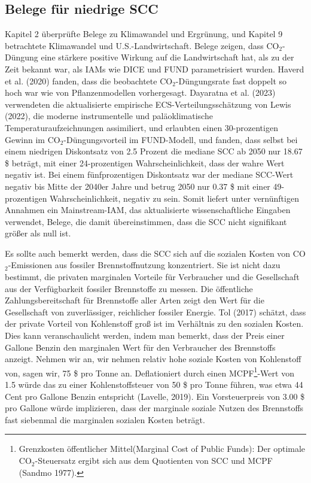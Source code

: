 \documentclass[12pt,paper=a4,DIV=12,parskip=never,chapterprefix=false,headings=standardclasses]{scrreprt}
\begin{document}
\subsection{Belege für niedrige SCC}
Kapitel 2 überprüfte Belege zu Klimawandel und Ergrünung, und Kapitel 9 betrachtete Klimawandel und U.S.-Landwirtschaft. Belege zeigen, dass CO$_2$-Düngung eine stärkere positive Wirkung auf die Landwirtschaft hat, als zu der Zeit bekannt war, als IAMs wie DICE und FUND parametrisiert wurden. Haverd et al. (2020) fanden, dass die beobachtete CO$_2$-Düngungsrate fast doppelt so hoch war wie von Pflanzenmodellen vorhergesagt.
Dayaratna et al. (2023) verwendeten die aktualisierte empirische ECS-Verteilungsschätzung von Lewis (2022), die moderne instrumentelle und paläoklimatische Temperaturaufzeichnungen assimiliert, und erlaubten einen 30-prozentigen Gewinn im CO$_2$-Düngungsvorteil im FUND-Modell, und fanden, dass selbst bei einem niedrigen Diskontsatz von 2.5 Prozent die mediane SCC ab 2050 nur 18.67 \$ beträgt, mit einer 24-prozentigen Wahrscheinlichkeit, dass der wahre Wert negativ ist. Bei einem fünfprozentigen Diskontsatz war der mediane SCC-Wert negativ bis Mitte der 2040er Jahre und betrug 2050 nur 0.37 \$ mit einer 49-prozentigen Wahrscheinlichkeit, negativ zu sein. Somit liefert unter vernünftigen Annahmen ein Mainstream-IAM, das aktualisierte wissenschaftliche Eingaben verwendet, Belege, die damit übereinstimmen, dass die SCC nicht signifikant größer als null ist.

Es sollte auch bemerkt werden, dass die SCC sich auf die sozialen Kosten von CO$_2$-Emissionen aus fossiler Brennstoffnutzung konzentriert. Sie ist nicht dazu bestimmt, die privaten marginalen Vorteile für Verbraucher und die Gesellschaft aus der Verfügbarkeit fossiler Brennstoffe zu messen. Die öffentliche Zahlungsbereitschaft für Brennstoffe aller Arten zeigt den Wert für die Gesellschaft von zuverlässiger, reichlicher fossiler Energie. Tol (2017) schätzt, dass der private Vorteil von Kohlenstoff groß ist im Verhältnis zu den sozialen Kosten. Dies kann veranschaulicht werden, indem man bemerkt, dass der Preis einer Gallone Benzin den marginalen Wert für den Verbraucher des Brennstoffs anzeigt. Nehmen wir an, wir nehmen relativ hohe soziale Kosten von Kohlenstoff von, sagen wir, 75 \$ pro Tonne an. Deflationiert durch einen MCPF\footnote{Grenzkosten öffentlicher Mittel(Marginal Cost of Public Funds): Der optimale CO$_2$-Steuersatz ergibt sich aus dem Quotienten von SCC und MCPF (Sandmo 1977).}-Wert von 1.5 würde das zu einer Kohlenstoffsteuer von 50 \$ pro Tonne führen, was etwa 44 Cent pro Gallone Benzin entspricht (Lavelle, 2019). Ein Vorsteuerpreis von 3.00 \$ pro Gallone würde implizieren, dass der marginale soziale Nutzen des Brennstoffs fast siebenmal die marginalen sozialen Kosten beträgt.
\end{document}
